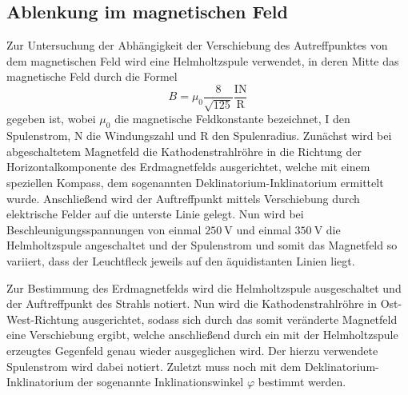 \subsection{Ablenkung im magnetischen Feld}
Zur Untersuchung der Abhängigkeit der Verschiebung des Autreffpunktes von dem
magnetischen Feld wird eine Helmholtzspule verwendet, in deren Mitte das magnetische
Feld durch die Formel
\begin{equation}
  B = \mu_0 \frac{8}{\sqrt{125}}\frac{\text{I}\text{N}}{\text{R}}
  \label{eqn:helmholtz}
\end{equation}
gegeben ist, wobei $\mu_0 $ die magnetische Feldkonstante bezeichnet, I den Spulenstrom,
N die Windungszahl und R den Spulenradius.
Zunächst wird bei abgeschaltetem Magnetfeld
die Kathodenstrahlröhre in die Richtung der Horizontalkomponente des Erdmagnetfelds ausgerichtet,
welche mit einem speziellen Kompass, dem sogenannten Deklinatorium-Inklinatorium ermittelt wurde.
Anschließend wird der Auftreffpunkt mittels Verschiebung durch elektrische Felder auf die
unterste Linie gelegt.
Nun wird bei Beschleunigungsspannungen von einmal $\SI{250}{\volt}$ und einmal $\SI{350}{\volt}$
die Helmholtzspule angeschaltet und der Spulenstrom und somit das Magnetfeld so
variiert, dass der Leuchtfleck jeweils auf den äquidistanten Linien liegt.


\noindent Zur Bestimmung des Erdmagnetfelds wird die Helmholtzspule ausgeschaltet
und der Auftreffpunkt des Strahls notiert.
Nun wird die Kathodenstrahlröhre in Ost-West-Richtung ausgerichtet, sodass sich durch das
somit veränderte Magnetfeld eine Verschiebung ergibt, welche anschließend durch
ein mit der Helmholtzspule erzeugtes Gegenfeld genau wieder ausgeglichen wird.
Der hierzu verwendete Spulenstrom wird dabei notiert. Zuletzt muss noch mit dem
Deklinatorium-Inklinatorium der sogenannte Inklinationswinkel $\varphi$ bestimmt
werden.

